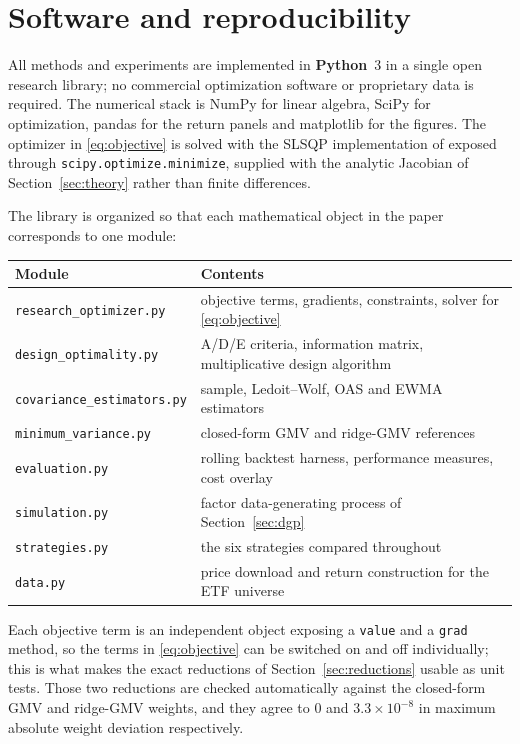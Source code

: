 \documentclass[11pt]{article}
\begin{document}
\section{Software and reproducibility}
\label{sec:software}
All methods and experiments are implemented in \textbf{Python}~3 in a single
open research library; no commercial optimization software or proprietary data
is required. The numerical stack is NumPy \citep{harris2020} for linear algebra,
SciPy \citep{virtanen2020} for optimization, pandas for the return panels and
matplotlib for the figures. The optimizer in \eqref{eq:objective} is solved with
the SLSQP implementation of \citet{kraft1988} exposed through
\texttt{scipy.optimize.minimize}, supplied with the analytic Jacobian of
Section~\ref{sec:theory} rather than finite differences.

The library is organized so that each mathematical object in the paper
corresponds to one module:

\begin{center}
\begin{tabular}{ll}
\toprule
\textbf{Module} & \textbf{Contents} \\
\midrule
\texttt{research\_optimizer.py} & objective terms, gradients, constraints, solver for \eqref{eq:objective} \\
\texttt{design\_optimality.py}  & A/D/E criteria, information matrix, multiplicative design algorithm \\
\texttt{covariance\_estimators.py} & sample, Ledoit--Wolf, OAS and EWMA estimators \\
\texttt{minimum\_variance.py}   & closed-form GMV and ridge-GMV references \\
\texttt{evaluation.py}          & rolling backtest harness, performance measures, cost overlay \\
\texttt{simulation.py}          & factor data-generating process of Section~\ref{sec:dgp} \\
\texttt{strategies.py}          & the six strategies compared throughout \\
\texttt{data.py}                & price download and return construction for the ETF universe \\
\bottomrule
\end{tabular}
\end{center}

Each objective term is an independent object exposing a \texttt{value} and a
\texttt{grad} method, so the terms in \eqref{eq:objective} can be switched on and
off individually; this is what makes the exact reductions of
Section~\ref{sec:reductions} usable as unit tests. Those two reductions are
checked automatically against the closed-form GMV and ridge-GMV weights, and they
agree to $0$ and $3.3\times10^{-8}$ in maximum absolute weight deviation
respectively.
\end{document}
